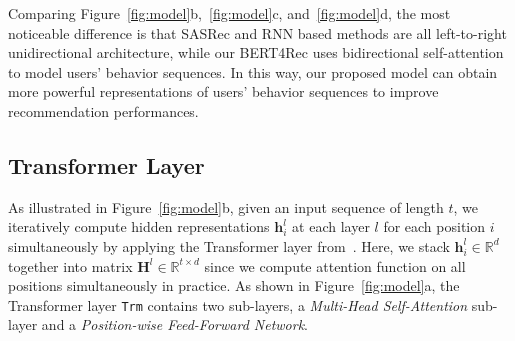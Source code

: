Comparing Figure~\ref{fig:model}b,~\ref{fig:model}c, and~\ref{fig:model}d, the most noticeable difference is that SASRec and RNN based methods are all left-to-right unidirectional architecture, while our BERT4Rec uses bidirectional self-attention to model users' behavior sequences.
In this way, our proposed model can obtain more powerful representations of users' behavior sequences to improve  recommendation performances.







\subsection{Transformer Layer}


As illustrated in Figure~\ref{fig:model}b, given an input sequence of length $t$, %
we iteratively compute hidden representations $\bm{h}_i^{l}$ at each layer $l$ for each position $i$ simultaneously by applying the Transformer layer from~\cite{Vaswani:nips2017:Attention}.
Here, we stack $\bm{h}_i^{l} \in \mathbb{R}^d$ together into matrix $\bm{H}^{l} {\in} \mathbb{R}^{t\times d}$ since we compute attention function on all positions simultaneously in practice. 
As shown in Figure~\ref{fig:model}a, the Transformer layer \texttt{Trm} contains two sub-layers, a \textit{Multi-Head Self-Attention} sub-layer and a \textit{Position-wise Feed-Forward Network}.

